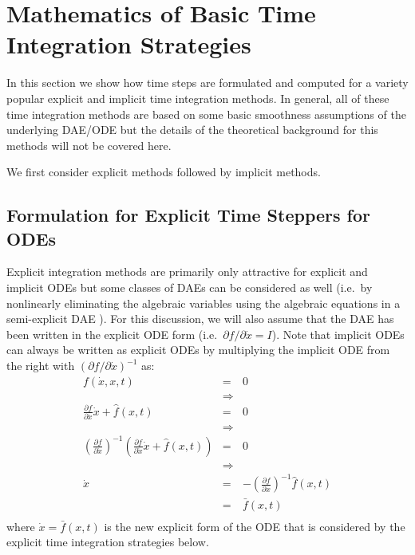 \documentclass[pdf,ps2pdf,11pt]{SANDreport}
\begin{document}
\section{Mathematics of Basic Time Integration Strategies}

In this section we show how time steps are formulated and computed for a
variety popular explicit and implicit time integration methods.  In general,
all of these time integration methods are based on some basic smoothness
assumptions of the underlying DAE/ODE but the details of the theoretical
background for this methods will not be covered here.

We first consider explicit methods followed by implicit methods.

\subsection{Formulation for Explicit Time Steppers for ODEs}

Explicit integration methods are primarily only attractive for explicit and
implicit ODEs but some classes of DAEs can be considered as well (i.e.\ by
nonlinearly eliminating the algebraic variables using the algebraic equations
in a semi-explicit DAE \cite{BCP}).  For this discussion, we will also assume
that the DAE has been written in the explicit ODE form (i.e.\ ${}\partial f /
{}\partial {}\dot{x} = I$).  Note that implicit ODEs can always be written as
explicit ODEs by multiplying the implicit ODE from the right with $({}\partial
f / {}\partial {}\dot{x})^{-1}$ as:
%
\begin{eqnarray*}
f(\dot{x},x,t) & = & 0 \\
& \Rightarrow \\
\frac{\partial f}{\partial \dot{x}} \dot{x} + \hat{f}(x,t) & = & 0 \\
& \Rightarrow \\
\left( \frac{\partial f}{\partial \dot{x}} \right)^{-1}
\left( \frac{\partial f}{\partial \dot{x}} \dot{x} + \hat{f}(x,t) \right) & = & 0 \\
& \Rightarrow \\
\dot{x} & = & -\left( \frac{\partial f}{\partial \dot{x}} \right)^{-1} \hat{f}(x,t) \\
& = & \bar{f}(x,t) \\
\end{eqnarray*}
%
where ${}\dot{x} = \bar{f}(x,t)$ is the new explicit form of the ODE that is
considered by the explicit time integration strategies below.
\end{document}
